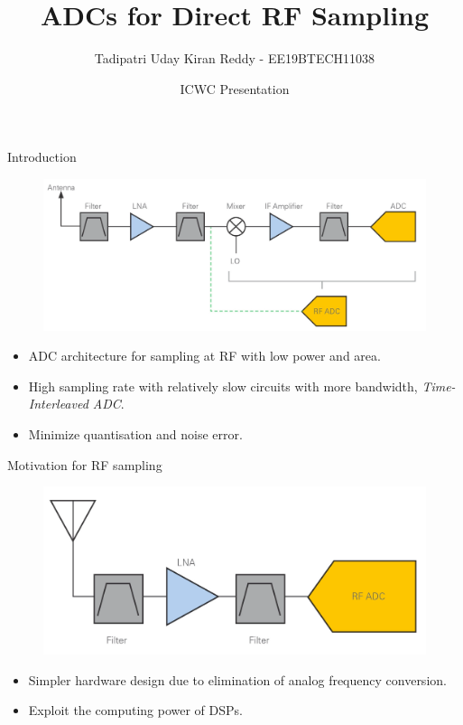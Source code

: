 \documentclass{beamer}
\title[ADCs for Direct RF Sampling]{ADCs for Direct RF Sampling}
\author[Tadipatri Uday Kiran Reddy]{Tadipatri Uday Kiran Reddy - EE19BTECH11038}
\institute[]{IIT Hyderabad}
\date{ICWC Presentation}
\begin{document}
\begin{frame}
  \titlepage
\end{frame}

\begin{frame}{Introduction}
\begin{figure}
	\includegraphics[scale=0.2]{./figs/arch.png}
\end{figure}
\pause
\begin{itemize}
	\item ADC architecture for sampling at RF with low power and area.
	\pause
	\item High sampling rate with relatively slow circuits with more bandwidth, \textit{Time-Interleaved ADC}.
	\pause
	\item Minimize quantisation and noise error.
\end{itemize}

\end{frame}

\begin{frame}{Motivation for RF sampling}
\begin{figure}
	\includegraphics[scale=0.2]{./figs/rf_arch.png}
\end{figure}
\begin{itemize}
	\item Simpler hardware design due to elimination of analog frequency conversion.
	\pause
	\item Exploit the computing power of DSPs.
\end{itemize}
\end{frame}
\end{document}
